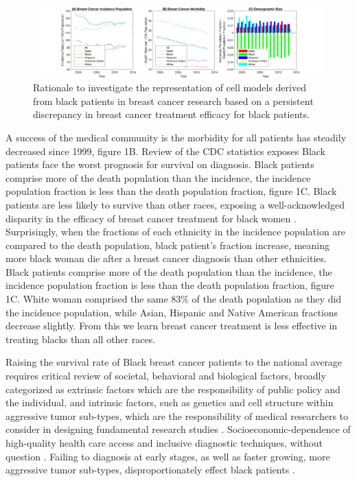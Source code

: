 \documentclass[11pt]{article}
\begin{document}
\begin{figure}[h!]
\centering
\includegraphics[width=1\columnwidth, trim = {20cm 0cm 10cm 0cm}, clip]{Figures/Rationale.jpg}
\caption{\label{PS} Rationale to investigate the representation of cell models derived from black patients in breast cancer research based on a persistent discrepancy in breast cancer treatment efficacy for black patients. }
\end{figure}

A success of the medical community is the morbidity for all patients has steadily decreased since 1999, figure 1B. Review of the CDC statistics exposes Black patients face the worst prognosis for survival on diagnosis. Black patients comprise more of the death population than the incidence, the incidence population fraction is less than the death population fraction, figure 1C. Black patients are less likely to survive than other races, exposing a well-acknowledged disparity in the efficacy of breast cancer treatment for black women \cite{greenlee2000cancer, berkman2014racial}. Surprisingly, when the fractions of each ethnicity in the incidence population are compared to the death population, black patient's fraction increase, meaning more black woman die after a breast cancer diagnosis than other ethnicities. Black patients comprise more of the death population than the incidence, the incidence population fraction is less than the death population fraction, figure 1C. White woman comprised the same 83\% of the death population as they did the incidence population, while  Asian, Hispanic and Native American fractions decrease slightly. From this we learn breast cancer treatment is less effective in treating blacks than all other races. 

Raising the survival rate of Black breast cancer patients to the national average requires critical review of societal, behavioral and biological factors, broadly categorized as extrinsic factors which are the responsibility of public policy and the individual, and intrinsic factors, such as genetics and cell structure within aggressive tumor sub-types, which are the responsibility of medical researchers to consider in designing fundamental research studies \cite{reding2012examination, brennan2012there}. Socioeconomic-dependence of high-quality health care access and inclusive diagnostic techniques, without question \cite{shavers2003racial}. Failing to diagnosis at early stages, as well as faster growing, more aggressive tumor sub-types, disproportionately effect black patients \cite{batina2013variation}. 
\end{document}
